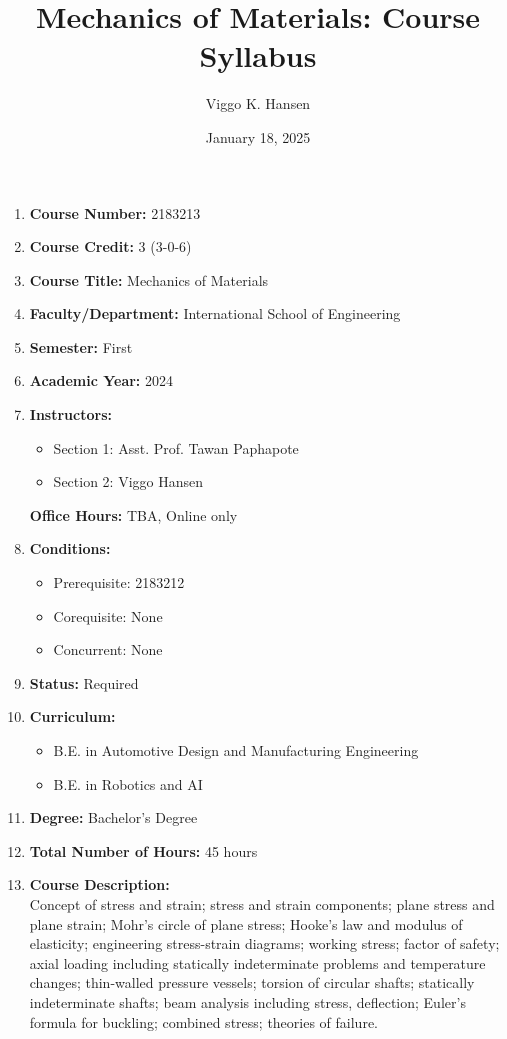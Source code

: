 \documentclass{article}
\title{Mechanics of Materials: Course Syllabus}
\author{Viggo K. Hansen}
\date{January 18, 2025}
\begin{document}
\maketitle

\begin{enumerate}
    \item \textbf{Course Number:} 2183213
    \item \textbf{Course Credit:} 3 (3-0-6)
    \item \textbf{Course Title:} Mechanics of Materials
    \item \textbf{Faculty/Department:} International School of Engineering
    \item \textbf{Semester:} First
    \item \textbf{Academic Year:} 2024
    \item \textbf{Instructors:}
        \begin{itemize}
            \item Section 1: Asst. Prof. Tawan Paphapote
            \item Section 2: Viggo Hansen
        \end{itemize}
        \textbf{Office Hours:} TBA, Online only
    \item \textbf{Conditions:}
        \begin{itemize}
            \item Prerequisite: 2183212
            \item Corequisite: None
            \item Concurrent: None
        \end{itemize}
    \item \textbf{Status:} Required
    \item \textbf{Curriculum:}
        \begin{itemize}
            \item B.E. in Automotive Design and Manufacturing Engineering
            \item B.E. in Robotics and AI
        \end{itemize}
    \item \textbf{Degree:} Bachelor's Degree
    \item \textbf{Total Number of Hours:} 45 hours
    \item \textbf{Course Description:} \\
    Concept of stress and strain; stress and strain components; plane stress and plane strain; Mohr's circle of plane stress; Hooke's law and modulus of elasticity; engineering stress-strain diagrams; working stress; factor of safety; axial loading including statically indeterminate problems and temperature changes; thin-walled pressure vessels; torsion of circular shafts; statically indeterminate shafts; beam analysis including stress, deflection; Euler's formula for buckling; combined stress; theories of failure.
    

\end{enumerate}
\end{document}
